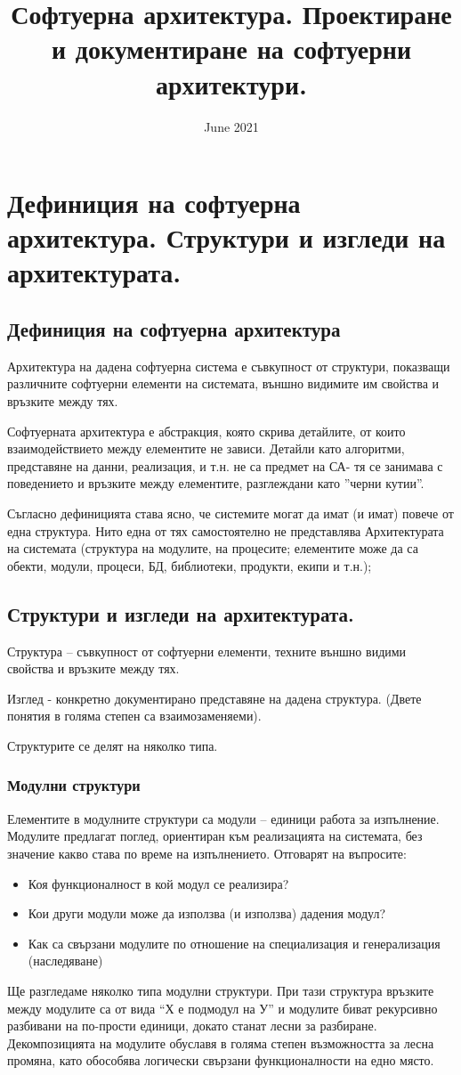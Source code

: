 \documentclass[fleqn,12pt]{article}
\title{Софтуерна архитектура. Проектиране и документиране на софтуерни
архитектури.}
\date{June 2021}
\makeatletter
\newcommand\subsubsubsection{\@startsection{paragraph}{4}{\z@}{-2.5ex\@plus -1ex \@minus -.25ex}{1.25ex \@plus .25ex}{\normalfont\normalsize\bfseries}}
\makeatother
\begin{document}
\maketitle

\section{Дефиниция на софтуерна архитектура. Структури и изгледи  на архитектурата.}
\subsection{Дефиниция на софтуерна архитектура}
Архитектура на дадена софтуерна система е съвкупност от структури, показващи различните софтуерни елементи на системата, външно видимите им свойства и връзките между тях.

Софтуерната архитектура е абстракция, която скрива
детайлите, от които взаимодействието между елементите не зависи. Детайли като алгоритми, представяне на данни, реализация, и т.н. не са
предмет на СА- тя се занимава с поведението и връзките между елементите, разглеждани като ''черни кутии''.

Съгласно дефиницията става ясно, че системите могат да имат (и имат)
повече от една структура. Нито една от тях самостоятелно не
представлява Архитектурата на системата (структура на модулите, на
процесите; елементите може да са обекти, модули, процеси, БД,
библиотеки, продукти, екипи и т.н.);
\subsection{Структури и изгледи на архитектурата. }
Структура – съвкупност от софтуерни елементи, техните външно видими свойства и връзките между тях.

Изглед - конкретно документирано представяне на дадена структура. (Двете понятия в голяма степен са взаимозаменяеми).

Структурите се делят на няколко типа.
\subsubsection{Модулни структури}
Елементите в модулните структури са модули – единици работа за изпълнение. Модулите предлагат поглед, ориентиран към реализацията на системата, без значение какво става по време на изпълнението.
Отговарят на въпросите:
\begin {itemize}
\item Коя функционалност в кой модул се реализира? 
\item Кои други модули може да използва (и използва) дадения модул? 
\item Как са свързани модулите по отношение на специализация и генерализация (наследяване)
\end {itemize}
Ще разгледаме няколко типа модулни структури.
\subsubsubsection{ Декомпозиция на модулите}
При тази структура връзките между модулите са от вида “Х е подмодул на У” и модулите биват рекурсивно разбивани на по-прости единици, докато станат лесни за разбиране. Декомпозицията на модулите обуславя в голяма степен възможността за лесна промяна, като обособява логически свързани функционалности на едно място.
\end{document}
